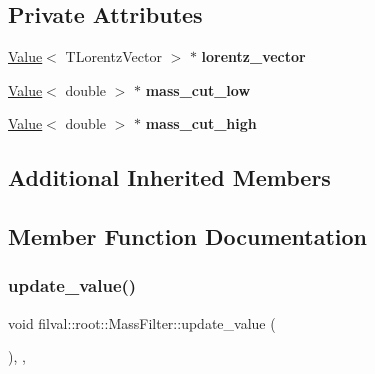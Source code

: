 \subsection*{Private Attributes}
\begin{DoxyCompactItemize}
\item 
\hypertarget{classfilval_1_1root_1_1MassFilter_ab81cb60b5175b6d83c0f771e3f77a0ef}{}\label{classfilval_1_1root_1_1MassFilter_ab81cb60b5175b6d83c0f771e3f77a0ef} 
\hyperlink{classfilval_1_1Value}{Value}$<$ T\+Lorentz\+Vector $>$ $\ast$ {\bfseries lorentz\+\_\+vector}
\item 
\hypertarget{classfilval_1_1root_1_1MassFilter_a309e2b1b3865b7ad0e13b0978a12ebca}{}\label{classfilval_1_1root_1_1MassFilter_a309e2b1b3865b7ad0e13b0978a12ebca} 
\hyperlink{classfilval_1_1Value}{Value}$<$ double $>$ $\ast$ {\bfseries mass\+\_\+cut\+\_\+low}
\item 
\hypertarget{classfilval_1_1root_1_1MassFilter_ac219cd20f6a5bb2374d868ccb8ea05bd}{}\label{classfilval_1_1root_1_1MassFilter_ac219cd20f6a5bb2374d868ccb8ea05bd} 
\hyperlink{classfilval_1_1Value}{Value}$<$ double $>$ $\ast$ {\bfseries mass\+\_\+cut\+\_\+high}
\end{DoxyCompactItemize}
\subsection*{Additional Inherited Members}


\subsection{Member Function Documentation}
\hypertarget{classfilval_1_1root_1_1MassFilter_a7858ca9aab96796fdb071b9ed55c5745}{}\label{classfilval_1_1root_1_1MassFilter_a7858ca9aab96796fdb071b9ed55c5745} 
\subsubsection{\texorpdfstring{update\+\_\+value()}{update\_value()}}
{\footnotesize\ttfamily void filval\+::root\+::\+Mass\+Filter\+::update\+\_\+value (\begin{DoxyParamCaption}{ }\end{DoxyParamCaption})\hspace{0.3cm}{\ttfamily [inline]}, {\ttfamily [private]}, {\ttfamily [virtual]}}



